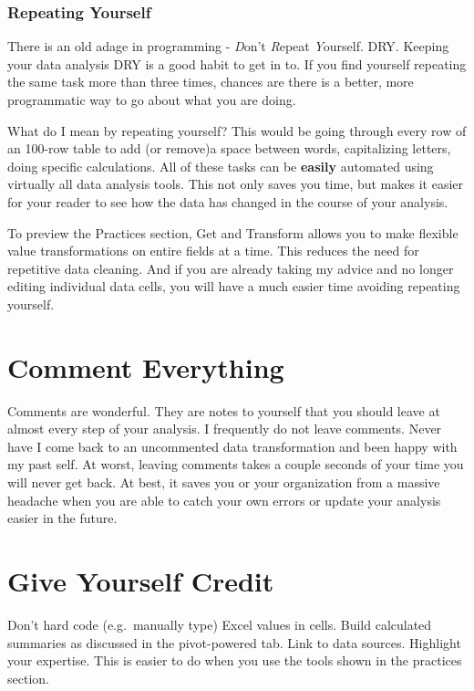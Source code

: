 \documentclass[
]{book}
\begin{document}
\hypertarget{repeating-yourself}{%
\subsubsection{Repeating Yourself}\label{repeating-yourself}}

There is an old adage in programming - \emph{D}on't \emph{R}epeat \emph{Y}ourself. DRY. Keeping your data analysis DRY is a good habit to get in to. If you find yourself repeating the same task more than three times, chances are there is a better, more programmatic way to go about what you are doing.

What do I mean by repeating yourself? This would be going through every row of an 100-row table to add (or remove)a space between words, capitalizing letters, doing specific calculations. All of these tasks can be \textbf{easily} automated using virtually all data analysis tools. This not only saves you time, but makes it easier for your reader to see how the data has changed in the course of your analysis.

To preview the Practices section, Get and Transform allows you to make flexible value transformations on entire fields at a time. This reduces the need for repetitive data cleaning. And if you are already taking my advice and no longer editing individual data cells, you will have a much easier time avoiding repeating yourself.

\hypertarget{comment-everything}{%
\section{Comment Everything}\label{comment-everything}}

Comments are wonderful. They are notes to yourself that you should leave at almost every step of your analysis. I frequently do not leave comments. Never have I come back to an uncommented data transformation and been happy with my past self. At worst, leaving comments takes a couple seconds of your time you will never get back. At best, it saves you or your organization from a massive headache when you are able to catch your own errors or update your analysis easier in the future.

\hypertarget{give-yourself-credit}{%
\section{Give Yourself Credit}\label{give-yourself-credit}}

Don't hard code (e.g.~manually type) Excel values in cells. Build calculated summaries as discussed in the pivot-powered tab. Link to data sources. Highlight your expertise. This is easier to do when you use the tools shown in the practices section.
\end{document}
